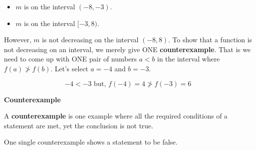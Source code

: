 \documentclass{ximera}
\begin{document}
\begin{example}
\begin{itemize}
\item $m$ is  on the interval $(-8,-3)$.  
\item $m$ is  on the interval $[-3, 8)$. 
\end{itemize}



However, $m$ is not decreasing on the interval $(-8, 8)$.  To show that a function is not decreasing on an interval, we merely give ONE \textbf{counterexample}. That is we need to come up with ONE pair of numbers $a < b$ in the interval where $f(a) \ngtr f(b)$.  Let's select $a = -4$ and $b = -3$.

\[ -4 < -3    \text{ but, }   f(-4) = 4  \ngtr f(-3) = 6 \]




\end{example}












\begin{idea} \textbf{\textcolor{blue!55!black}{Counterexample}} 

A \textbf{counterexample} is one example where all the required conditions of a statement are met, yet the conclusion is not true.  

One single counterexample shows a statement to be false.


\end{idea}
\end{document}
